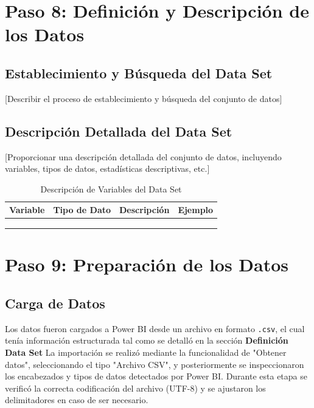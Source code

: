 \documentclass[12pt,letterpaper]{report}
\begin{document}
\section{Paso 8: Definición y Descripción de los Datos}

\subsection{Establecimiento y Búsqueda del Data Set}
[Describir el proceso de establecimiento y búsqueda del conjunto de datos]

\subsection{Descripción Detallada del Data Set}
[Proporcionar una descripción detallada del conjunto de datos, incluyendo variables, tipos de datos, estadísticas descriptivas, etc.]

\begin{table}[H]
    \centering
    \begin{tabularx}{\textwidth}{|X|X|X|X|}
        \hline
        \textbf{Variable} & \textbf{Tipo de Dato} & \textbf{Descripción} & \textbf{Ejemplo} \\
        \hline
        & & & \\
        \hline
        & & & \\
        \hline
        & & & \\
        \hline
    \end{tabularx}
    \caption{Descripción de Variables del Data Set}
\end{table}

\section{Paso 9: Preparación de los Datos}

\subsection{Carga de Datos}
Los datos fueron cargados a Power BI desde un archivo en formato \texttt{.csv}, el cual tenía información estructurada tal como se detalló en la sección \textbf{Definición Data Set} La importación se realizó mediante la funcionalidad de "Obtener datos", seleccionando el tipo "Archivo CSV", y posteriormente se inspeccionaron los encabezados y tipos de datos detectados por Power BI. Durante esta etapa se verificó la correcta codificación del archivo (UTF-8) y se ajustaron los delimitadores en caso de ser necesario.
\end{document}
